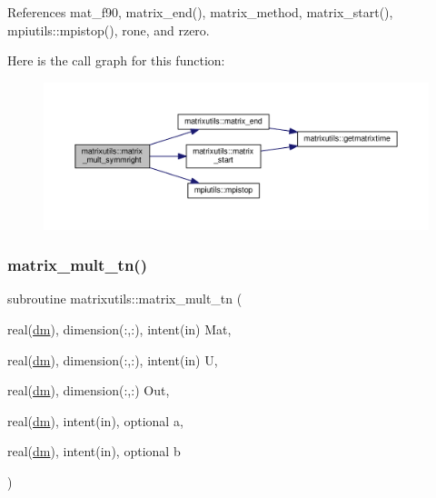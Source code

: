 References mat\+\_\+f90, matrix\+\_\+end(), matrix\+\_\+method, matrix\+\_\+start(), mpiutils\+::mpistop(), rone, and rzero.

Here is the call graph for this function\+:
\nopagebreak
\begin{figure}[H]
\begin{center}
\leavevmode
\includegraphics[width=350pt]{namespacematrixutils_a97a6a772baa3485aaddba50623e50673_cgraph}
\end{center}
\end{figure}
\mbox{\label{namespacematrixutils_a13557cd7745827af9e6873d3dbba3a1f}} 
\subsubsection{\texorpdfstring{matrix\+\_\+mult\+\_\+tn()}{matrix\_mult\_tn()}}
{\footnotesize\ttfamily subroutine matrixutils\+::matrix\+\_\+mult\+\_\+tn (\begin{DoxyParamCaption}\item[{real(\mbox{\hyperlink{namespacematrixutils_a7bdc564986ea4d90f51201c75606ef3d}{dm}}), dimension(\+:,\+:), intent(in)}]{Mat,  }\item[{real(\mbox{\hyperlink{namespacematrixutils_a7bdc564986ea4d90f51201c75606ef3d}{dm}}), dimension(\+:,\+:), intent(in)}]{U,  }\item[{real(\mbox{\hyperlink{namespacematrixutils_a7bdc564986ea4d90f51201c75606ef3d}{dm}}), dimension(\+:,\+:)}]{Out,  }\item[{real(\mbox{\hyperlink{namespacematrixutils_a7bdc564986ea4d90f51201c75606ef3d}{dm}}), intent(in), optional}]{a,  }\item[{real(\mbox{\hyperlink{namespacematrixutils_a7bdc564986ea4d90f51201c75606ef3d}{dm}}), intent(in), optional}]{b }\end{DoxyParamCaption})}



